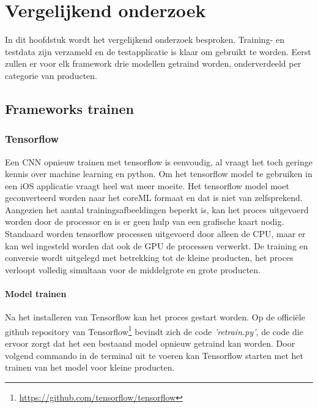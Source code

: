 \chapter{Vergelijkend onderzoek}
\label{ch:vergelijkend onderzoek}

In dit hoofdstuk wordt het vergelijkend onderzoek besproken. Training- en testdata zijn verzameld en de testapplicatie is klaar om gebruikt te worden. Eerst zullen er voor elk framework drie modellen getraind worden, onderverdeeld per categorie van producten. 

\section{Frameworks trainen}
\label{sec:Tensorflow}

\subsection{Tensorflow}
\label{ssec:Tensorflow}

Een CNN opnieuw trainen met tensorflow is eenvoudig, al vraagt het toch geringe kennis over machine learning en python. Om het tensorflow model te gebruiken in een iOS applicatie vraagt heel wat meer moeite. Het tensorflow model moet geconverteerd worden naar het coreML formaat en dat is niet van zelfsprekend. Aangezien het aantal trainingsafbeeldingen beperkt is, kan het proces uitgevoerd worden door de processor en is er geen hulp van een grafische kaart nodig. Standaard worden tensorflow processen uitgevoerd door alleen de CPU, maar er kan wel ingesteld worden dat ook de GPU de processen verwerkt.  De training en conversie wordt uitgelegd met betrekking tot de kleine producten, het proces verloopt volledig simultaan voor de middelgrote en grote producten.  

\subsubsection{Model trainen}
\label{sssec:Model trainen}

Na het installeren van Tensorflow kan het proces gestart worden. Op de officiële github repository van Tensorflow\footnote{\url{https://github.com/tensorflow/tensorflow}} bevindt zich de code \textit{'retrain.py'}, de code die ervoor zorgt dat het een bestaand model opnieuw getraind kan worden. Door volgend commando in de terminal uit te voeren kan Tensorflow starten met het trainen van het model voor kleine producten.

